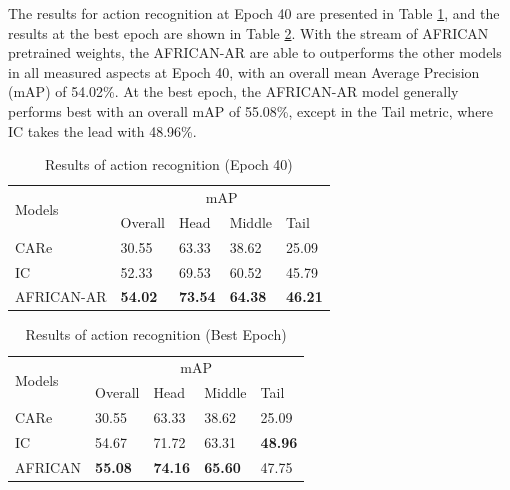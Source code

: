 The results for action recognition at Epoch 40 are presented in Table \ref{tab:allresults40}, and the results at the best epoch are shown in Table \ref{tab:allresultsbest}. With the stream of AFRICAN pretrained weights, the AFRICAN-AR are able to outperforms the other models in all measured aspects at Epoch 40, with an overall mean Average Precision (mAP) of 54.02\%. At the best epoch, the AFRICAN-AR model generally performs best with an overall mAP of 55.08\%, except in the Tail metric, where IC takes the lead with 48.96\%.


\begin{table}[h]
    \centering
    \caption{Results of action recognition (Epoch 40)}
    \label{tab:allresults40}
    \begin{tabular}{lllll}
        \toprule
        \multirow{2}{*}{Models} & \multicolumn{4}{c}{mAP} \\
        \cmidrule{2-5} 
        {} & Overall & Head  & Middle & Tail \\
        \midrule
        CARe          & 30.55   & 63.33 & 38.62 & 25.09 \\
        IC            & 52.33   & 69.53 & 60.52 & 45.79 \\        
        AFRICAN-AR    & \textbf{54.02} & \textbf{73.54} & \textbf{64.38} & \textbf{46.21} \\
        \bottomrule
    \end{tabular}
\end{table}

\begin{table}[h]
    \centering
    \caption{Results of action recognition (Best Epoch)}
    \label{tab:allresultsbest}
    \begin{tabular}{lllll}
        \toprule
        \multirow{2}{*}{Models} & \multicolumn{4}{c}{mAP} \\
        \cmidrule{2-5} 
        {} & Overall & Head  & Middle & Tail \\
        \midrule
        CARe        & 30.55   & 63.33 & 38.62  & 25.09 \\
        IC          & 54.67   & 71.72 & 63.31 & \textbf{48.96} \\
        AFRICAN     & \textbf{55.08} & \textbf{74.16} & \textbf{65.60} & 47.75 \\
        \bottomrule
    \end{tabular}
\end{table}









